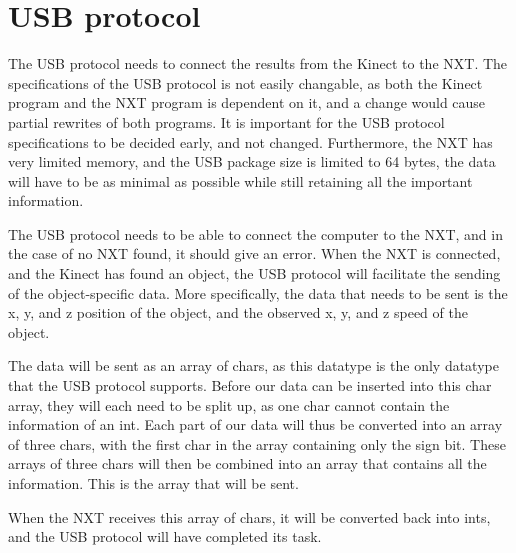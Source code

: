 \section{USB protocol}
\label{sec:design-usb}
The USB protocol needs to connect the results from the Kinect to the NXT. The specifications of the USB protocol is not easily changable, as both the Kinect program and the NXT program is dependent on it, and a change would cause partial rewrites of both programs. It is important for the USB protocol specifications to be decided early, and not changed.
Furthermore, the NXT has very limited memory, and the USB package size is limited to 64 bytes, the data will have to be as minimal as possible while still retaining all the important information. 

The USB protocol needs to be able to connect the computer to the NXT, and in the case of no NXT found, it should give an error.
When the NXT is connected, and the Kinect has found an object, the USB protocol will facilitate the sending of the object-specific data.
More specifically, the data that needs to be sent is the x, y, and z position of the object, and the observed x, y, and z speed of the object.

The data will be sent as an array of chars, as this datatype is the only datatype that the USB protocol supports. Before our data can be inserted into this char array, they will each need to be split up, as one char cannot contain the information of an int. Each part of our data will thus be converted into an array of three chars, with the first char in the array containing only the sign bit. These arrays of three chars will then be combined into an array that contains all the information. This is the array that will be sent.

When the NXT receives this array of chars, it will be converted back into ints, and the USB protocol will have completed its task.